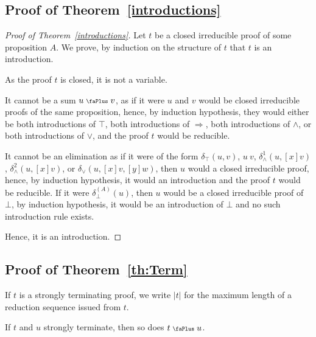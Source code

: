 \documentclass[screen, sigconf,authorversion,nonacm]{acmart}
\theoremstyle{acmdefinition}
\numberwithin{equation}{section}
\newcommand\abstr[1]{[#1]}
\newcommand\elimtop{\delta_{\top}}
\newcommand\elimbot[1]{\delta^{(#1)}_{\bot}}
\newcommand\elimand{\delta_{\wedge}}
\newcommand\elimor{\delta_{\vee}}
\newcommand\plus{\mathrel{\text{\normalfont\scalebox{0.7}{\faPlus}}}}
\begin{document}
\subsection{Proof of Theorem~\ref{introductions}}
\begin{proof}[Proof of Theorem~\ref{introductions}]
  Let $t$ be a closed irreducible proof of some proposition $A$. We prove,
  by induction on the structure of $t$ that $t$ is an introduction.

  As the proof $t$ is closed, it is not a variable.

  It cannot be a sum $u \plus v$, as if it were $u$ and $v$ would be
  closed irreducible proofs of the same proposition, hence, by induction
  hypothesis, they would either be both introductions of $\top$, both
  introductions of $\Rightarrow$, both introductions of $\wedge$, or
  both introductions of $\vee$, and the proof $t$ would be reducible.

  It cannot be an elimination as if it were of the form $\elimtop(u,v)$,
  $u~v$, $\elimand^1(u,\abstr{x}v)$, $\elimand^2(u,\abstr{x}v)$, or
  $\elimor(u,\abstr{x}v,\abstr{y}w)$, then $u$ would a closed
  irreducible proof, hence, by induction hypothesis, it would an
  introduction and the proof $t$ would be reducible.  If it were
  $\elimbot{A}(u)$, then $u$ would be a closed irreducible proof of $\bot$,
  by induction hypothesis, it would be an introduction of $\bot$ and no
  such introduction rule exists.

  Hence, it is an introduction. \qedhere
\end{proof}


\subsection{Proof of Theorem~\ref{th:Term}}

\begin{definition}
If $t$ is a strongly terminating proof, we write $|t|$ for the
maximum length of a reduction sequence issued from $t$.
\end{definition}

\begin{proposition}
\label{terminationsum}
If $t$ and $u$ strongly terminate, then so does $t \plus u$. 
\end{proposition}
\end{document}
